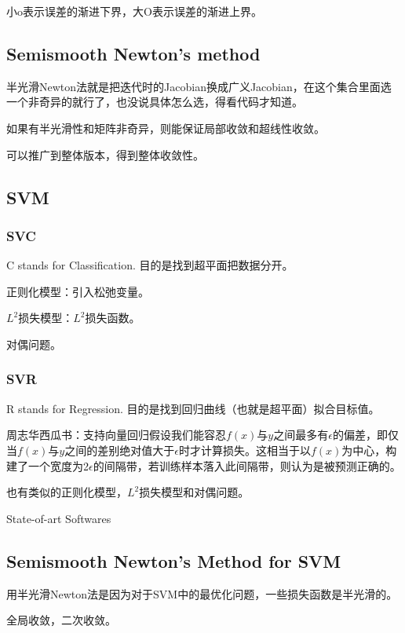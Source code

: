 小o表示误差的渐进下界，大O表示误差的渐进上界。

\subsection{Semismooth Newton's method}

半光滑Newton法就是把迭代时的Jacobian换成广义Jacobian，在这个集合里面选一个非奇异的就行了，也没说具体怎么选，得看代码才知道。

如果有半光滑性和矩阵非奇异，则能保证局部收敛和超线性收敛。

可以推广到整体版本，得到整体收敛性。

\subsection{SVM}

\subsubsection{SVC}

C stands for Classification. 目的是找到超平面把数据分开。

正则化模型：引入松弛变量。

$L^2$损失模型：$L^2$损失函数。

对偶问题。

\subsubsection{SVR}

R stands for Regression. 目的是找到回归曲线（也就是超平面）拟合目标值。

周志华西瓜书：支持向量回归假设我们能容忍$f(x)$与$y$之间最多有$\epsilon$的偏差，即仅当$f(x)$与$y$之间的差别绝对值大于$\epsilon$时才计算损失。这相当于以$f(x)$为中心，构建了一个宽度为2$\epsilon$的间隔带，若训练样本落入此间隔带，则认为是被预测正确的。

也有类似的正则化模型，$L^2$损失模型和对偶问题。

State-of-art Softwares

\subsection{Semismooth Newton's Method for SVM}

用半光滑Newton法是因为对于SVM中的最优化问题，一些损失函数是半光滑的。

全局收敛，二次收敛。

